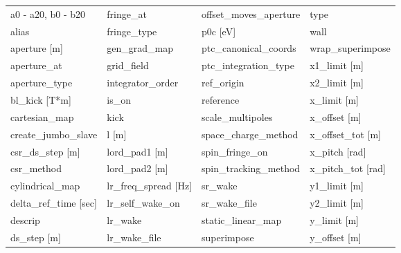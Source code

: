  \begin{tabular}{llll} \toprule
a0 - a20, b0 - b20               & fringe_at                        & offset_moves_aperture            & type                             \\
alias                            & fringe_type                      & p0c [eV]                         & wall                             \\
aperture [m]                     & gen_grad_map                     & ptc_canonical_coords             & wrap_superimpose                 \\
aperture_at                      & grid_field                       & ptc_integration_type             & x1_limit [m]                     \\
aperture_type                    & integrator_order                 & ref_origin                       & x2_limit [m]                     \\
bl_kick [T*m]                    & is_on                            & reference                        & x_limit [m]                      \\
cartesian_map                    & kick                             & scale_multipoles                 & x_offset [m]                     \\
create_jumbo_slave               & l [m]                            & space_charge_method              & x_offset_tot [m]                 \\
csr_ds_step [m]                  & lord_pad1 [m]                    & spin_fringe_on                   & x_pitch [rad]                    \\
csr_method                       & lord_pad2 [m]                    & spin_tracking_method             & x_pitch_tot [rad]                \\
cylindrical_map                  & lr_freq_spread [Hz]              & sr_wake                          & y1_limit [m]                     \\
delta_ref_time [sec]             & lr_self_wake_on                  & sr_wake_file                     & y2_limit [m]                     \\
descrip                          & lr_wake                          & static_linear_map                & y_limit [m]                      \\
ds_step [m]                      & lr_wake_file                     & superimpose                      & y_offset [m]                     \\

\end{tabular}
